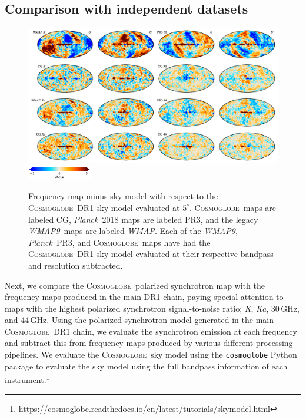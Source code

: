 \documentclass[twocolumn]{../../common/aa}
\def\WMAP{\emph{WMAP}}
\def\WMAPnine{\emph{WMAP9}}
\def\Planck{\emph{Planck}}
\newcommand{\cosmoglobe}{\textsc{Cosmoglobe}}
\newcommand{\K}[0]{\textit K}
\newcommand{\Ka}[0]{\textit{Ka}}
\begin{document}
\subsection{Comparison with independent datasets}
\label{sec:comp_independent}

\begin{figure}
	\begin{center}
	\includegraphics[width=\textwidth]{figures/CG_DR1_residuals.pdf}
        \includegraphics[width=0.25\textwidth]{figures/cbar_5uK.pdf}
	\end{center}
	\caption{Frequency map minus sky model with respect to the \cosmoglobe\ DR1 sky model evaluated at $5^\circ$. \cosmoglobe\ maps are labeled CG, \Planck\ 2018 maps are labeled PR3, and the legacy \WMAPnine\ maps are labeled \WMAP. Each of the \WMAPnine, \Planck\ PR3, and \cosmoglobe\ maps have had the \cosmoglobe\ DR1 sky model evaluated at their respective bandpass and resolution subtracted. 
	}
	\label{fig:cg_residuals}
\end{figure}

Next, we compare the \cosmoglobe\ polarized synchrotron map with the frequency maps produced in the main DR1 chain, paying special attention to maps with the highest polarized synchrotron signal-to-noise ratio; \K, \Ka, 30\,GHz, and 44\,GHz.
Using the polarized synchrotron model generated in the main \cosmoglobe\ DR1 chain, we evaluate the synchrotron emission at each frequency and subtract this from frequency maps produced by various different processing pipelines. We evaluate the \cosmoglobe\ sky model using the \texttt{cosmoglobe} Python package to evaluate the sky model using the full bandpass information of each instrument.\footnote{\url{https://cosmoglobe.readthedocs.io/en/latest/tutorials/skymodel.html}} %
\end{document}

